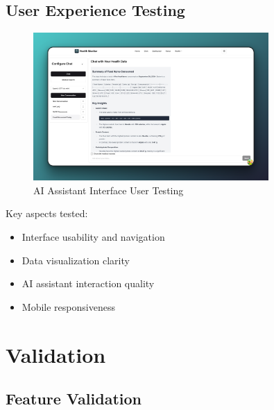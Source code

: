 \subsection{User Experience Testing}
\begin{figure}[H]
    \centering
    \includegraphics[width=0.8\textwidth]{public/landing/hm-chat-light.png}
    \caption{AI Assistant Interface User Testing}
\end{figure}

Key aspects tested:
\begin{itemize}
    \item Interface usability and navigation
    \item Data visualization clarity
    \item AI assistant interaction quality
    \item Mobile responsiveness
\end{itemize}

\section{Validation}
\subsection{Feature Validation}

